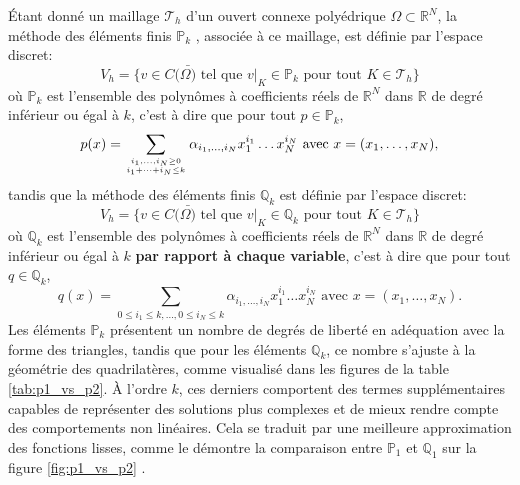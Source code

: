 \'Etant donné un maillage $\mathcal{T}_h$ d'un ouvert connexe polyédrique $\Omega\subset\mathbb{R}^N$, la méthode des éléments finis $\mathbb{P}_k$ \cite{allaire2005analyse}, associée à ce maillage, est définie par l'espace discret:
$$V_h=\{v\in C(\bar{\Omega)}\text{ tel que }v|_{K}\in\mathbb{P}_k\text{ pour tout }K\in\mathcal{T}_h\}$$
où $\mathbb{P}_k$ est l'ensemble des polynômes à coefficients réels de $\mathbb{R}^N$ dans $\mathbb{R}$ de degré inférieur ou égal à $k$, c'est à dire que pour tout $p\in\mathbb{P}_k$,
$$p(x)=\displaystyle\sum_{i_1,\dots, i_N\geq 0\atop i_1+\dots+i_N\leq k}\alpha_{i_1,\dots,i_N}x_1^{i_1}\dots x_N^{i_N}\text{ avec }x=(x_1,\dots,x_N),$$
tandis que la méthode des éléments finis $\mathbb{Q}_k$ est définie par l'espace discret:
$$V_h=\{v\in C(\bar{\Omega)}\text{ tel que }v|_{K}\in\mathbb{Q}_k\text{ pour tout }K\in\mathcal{T}_h\}$$
où $\mathbb{Q}_k$ est l'ensemble des polynômes à coefficients réels de $\mathbb{R}^N$ dans $\mathbb{R}$ de degré inférieur ou égal à $k$ \textbf{par rapport à chaque variable}, c'est à dire que pour tout $q\in\mathbb{Q}_k$,
$$q(x)=\displaystyle\sum_{0\leq i_1\leq k,\dots,0\leq i_N\leq k}\alpha_{i_1,\dots,i_N}x_1^{i_1}\dots x_N^{i_N}\text{ avec }x=(x_1,\dots,x_N).$$
Les éléments $\mathbb{P}_k$ présentent un nombre de degrés de liberté en adéquation avec la forme des triangles, tandis que pour les éléments $\mathbb{Q}_k$, ce nombre s'ajuste à la géométrie des quadrilatères, comme visualisé dans les figures de la table \ref{tab:p1_vs_p2}. À l'ordre $k$, ces derniers comportent des termes supplémentaires capables de représenter des solutions plus complexes et de mieux rendre compte des comportements non linéaires. Cela se traduit par une meilleure approximation des fonctions lisses, comme le démontre la comparaison entre $\mathbb{P}_1$ et $\mathbb{Q}_1$ sur la figure \ref{fig:p1_vs_p2} \cite{reberol2018maillages}.

